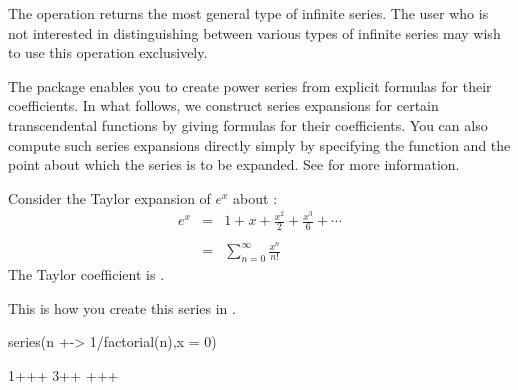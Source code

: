 {{{{{{{{{{{{{{{\beginImportant
The operation  returns the most general type of
infinite series.
The user who is not interested in distinguishing
between various types of infinite series may wish to use this operation
exclusively.
\endImportant


The  package enables you to
create power series from explicit formulas for their
 coefficients.
In what follows, we construct series expansions for certain
transcendental functions by giving formulas for their
coefficients.
You can also compute such series expansions directly simply by
specifying the function and the point about which the series is to
be expanded.
See  for more information.

Consider the Taylor expansion of $e^x$
about :
\begin{displaymath}
\begin{array}{ccl}
e^x &=& \displaystyle 1 + x + \frac{x^2}{2} + \frac{x^3}{6} + \cdots \\ \\
    &=& \displaystyle\sum_{n=0}^\infty \frac{x^n}{n!}
\end{array}
\end{displaymath}
The  Taylor coefficient is .
%
\begin{xtc}
\begin{xtccomment}
This is how you create this series in \Language{}.
\end{xtccomment}
\begin{spadsrc}
series(n +-> 1/factorial(n),x = 0)
\end{spadsrc}
\begin{TeXOutput}
\begin{fricasmath}{1}
1++\TIMES {}+\TIMES \SUPER%
{}{3}+\TIMES {}+\TIMES %
+\TIMES {}+\TIMES {}+%
\end{fricasmath}
\end{TeXOutput}
\end{xtc}

}}}}}}}}}}}}}}}
